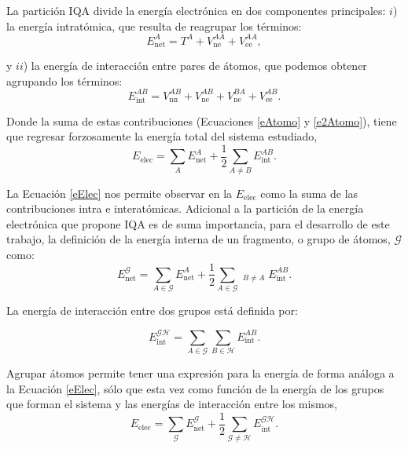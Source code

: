 La partición IQA divide la energía electrónica en dos componentes principales:
$i$) la energía intratómica, que resulta de reagrupar los términos:
%
\begin{equation} \label{eAtomo}
E^A_{\mathrm{net}} = T^A + V_{\mathrm{ne}}^{AA} + V_{\mathrm{ee}}^{AA},
\end{equation}

\noindent y $ii$) la energía de interacción entre pares de átomos, que podemos
obtener agrupando los términos:
\begin{equation} \label{e2Atomo}
  E^{AB}_{\mathrm{int}} = V_{\mathrm{nn}}^{AB} + V_{\mathrm{ne}}^{AB}
  + V_{\mathrm{ne}}^{BA} + V_{\mathrm{ee}}^{AB}.
\end{equation}

Donde la suma de estas contribuciones (Ecuaciones \ref{eAtomo} y
\ref{e2Atomo}), tiene que regresar forzosamente la energía total del sistema
estudiado,
%
\begin{equation} \label{eElec}
E_{\mathrm{elec}} = 
  \sum_A E^A_{\mathrm{net}} + \frac{1}{2} \sum_{A \neq B} E_{\mathrm{int}}^{AB}.
\end{equation}

La Ecuación \ref{eElec} nos permite observar en la $E_{\mathrm{elec}}$ como la
suma de las contribuciones intra e interatómicas.  Adicional a la partición de
la energía electrónica que propone IQA es de suma importancia, para el
desarrollo de este trabajo, la definición de la energía interna de un
fragmento, o grupo de átomos, $\mathscr{G}$ como:
\begin{equation} \label{eG}
E^{\mathscr{G}}_{\mathrm{net}} = \sum_{A \in \mathscr{G}} E^A_{\mathrm{net}} 
    +\frac{1}{2} \sum_{A\in \mathscr{G}}
		\mathop{\sum_{B \in \mathscr{G}}}_{B \neq A} E_{\mathrm{int}}^{AB}.
\end{equation}

\noindent La energía de interacción entre dos grupos está definida por:

\begin{equation} \label{energiaGH}
E^{\mathscr{GH}}_{\mathrm{int}} = \sum_{A \in \mathscr{G}} \sum_{B \in
		 \mathscr{H}} E_{\mathrm{int}}^{AB}.
\end{equation}

Agrupar átomos permite tener una expresión para la energía de forma análoga a
la Ecuación \ref{eElec}, sólo que esta vez como función de la energía de los
grupos que forman el sistema y las energías de interacción entre los mismos,
%
\begin{equation} \label{energiaGrupos}
  E_{\mathrm{elec}} = \sum_{\mathscr{G}} E^{\mathscr{G}}_{\mathrm{net}} 
  +\frac{1}{2} \sum_{\mathscr{G} \neq \mathscr{H}} E_{\mathrm{int}}^{\mathscr{GH}}.
\end{equation}

